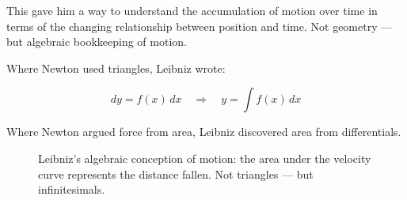 This gave him a way to understand the accumulation of motion over time in terms of the changing relationship between position and time. Not geometry — but algebraic bookkeeping of motion.

Where Newton used triangles, Leibniz wrote:

\[
dy = f(x)\,dx \quad \Rightarrow \quad y = \int f(x)\,dx
\]

Where Newton argued force from area, Leibniz discovered area from differentials.

\begin{figure}[H]
\centering
{}
\caption{Leibniz’s algebraic conception of motion: the area under the velocity curve represents the distance fallen. Not triangles — but infinitesimals.}
\end{figure}



